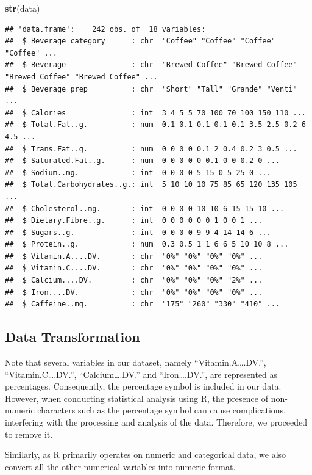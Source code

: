 \documentclass[
]{article}
\newenvironment{Shaded}{\begin{snugshade}}{\end{snugshade}}
\newcommand{\FunctionTok}[1]{\textcolor[rgb]{0.13,0.29,0.53}{\textbf{#1}}}
\newcommand{\NormalTok}[1]{#1}
\begin{document}
\begin{Shaded}
\begin{Highlighting}[]
\FunctionTok{str}\NormalTok{(data)}
\end{Highlighting}
\end{Shaded}

\begin{verbatim}
## 'data.frame':    242 obs. of  18 variables:
##  $ Beverage_category      : chr  "Coffee" "Coffee" "Coffee" "Coffee" ...
##  $ Beverage               : chr  "Brewed Coffee" "Brewed Coffee" "Brewed Coffee" "Brewed Coffee" ...
##  $ Beverage_prep          : chr  "Short" "Tall" "Grande" "Venti" ...
##  $ Calories               : int  3 4 5 5 70 100 70 100 150 110 ...
##  $ Total.Fat..g.          : num  0.1 0.1 0.1 0.1 0.1 3.5 2.5 0.2 6 4.5 ...
##  $ Trans.Fat..g.          : num  0 0 0 0 0.1 2 0.4 0.2 3 0.5 ...
##  $ Saturated.Fat..g.      : num  0 0 0 0 0 0.1 0 0 0.2 0 ...
##  $ Sodium..mg.            : int  0 0 0 0 5 15 0 5 25 0 ...
##  $ Total.Carbohydrates..g.: int  5 10 10 10 75 85 65 120 135 105 ...
##  $ Cholesterol..mg.       : int  0 0 0 0 10 10 6 15 15 10 ...
##  $ Dietary.Fibre..g.      : int  0 0 0 0 0 0 1 0 0 1 ...
##  $ Sugars..g.             : int  0 0 0 0 9 9 4 14 14 6 ...
##  $ Protein..g.            : num  0.3 0.5 1 1 6 6 5 10 10 8 ...
##  $ Vitamin.A....DV.       : chr  "0%" "0%" "0%" "0%" ...
##  $ Vitamin.C....DV.       : chr  "0%" "0%" "0%" "0%" ...
##  $ Calcium....DV.         : chr  "0%" "0%" "0%" "2%" ...
##  $ Iron....DV.            : chr  "0%" "0%" "0%" "0%" ...
##  $ Caffeine..mg.          : chr  "175" "260" "330" "410" ...
\end{verbatim}

\subsection{Data Transformation}\label{data-transformation}

Note that several variables in our dataset, namely
``Vitamin.A\ldots.DV.'', ``Vitamin.C\ldots.DV.'', ``Calcium\ldots.DV.''
and ``Iron\ldots.DV.'', are represented as percentages. Consequently,
the percentage symbol is included in our data. However, when conducting
statistical analysis using R, the presence of non-numeric characters
such as the percentage symbol can cause complications, interfering with
the processing and analysis of the data. Therefore, we proceeded to
remove it.

Similarly, as R primarily operates on numeric and categorical data, we
also convert all the other numerical variables into numeric format.
\end{document}
